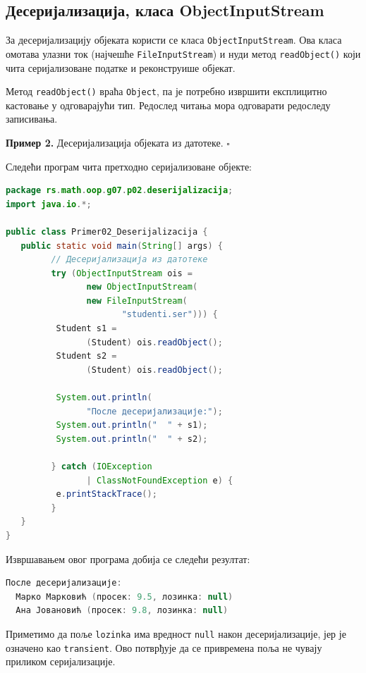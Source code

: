 \subsection{Десеријализација, класа ObjectInputStream}

За десеријализацију објеката користи се класа \texttt{ObjectInputStream}. Ова класа омотава улазни ток (најчешће \texttt{FileInputStream}) и нуди метод \texttt{readObject()} који чита серијализоване податке и реконструише објекат.

Метод \texttt{readObject()} враћа \texttt{Object}, па је потребно извршити експлицитно кастовање у одговарајући тип. Редослед читања мора одговарати редоследу записивања.


\bigskip

\noindent \textbf{Пример 2.} Десеријализација објеката из датотеке. $\square$

\medskip

Следећи програм чита претходно серијализоване објекте:


\begin{lstlisting}[language=Java]
package rs.math.oop.g07.p02.deserijalizacija;
import java.io.*;
 
public class Primer02_Deserijalizacija {
   public static void main(String[] args) {
         // Десеријализација из датотеке
         try (ObjectInputStream ois =
                new ObjectInputStream(
                new FileInputStream(
                       "studenti.ser"))) {
          Student s1 =
                (Student) ois.readObject();
          Student s2 =
                (Student) ois.readObject();
 
          System.out.println(
                "После десеријализације:");
          System.out.println("  " + s1);
          System.out.println("  " + s2);
 
         } catch (IOException
                | ClassNotFoundException e) {
          e.printStackTrace();
         }
   }
}
\end{lstlisting}


Извршавањем овог програма добија се следећи резултат:


\begin{lstlisting}[language=Java]
После десеријализације:
  Марко Марковић (просек: 9.5, лозинка: null)
  Ана Јовановић (просек: 9.8, лозинка: null)
\end{lstlisting}


Приметимо да поље \texttt{lozinka} има вредност \texttt{null} након десеријализације, јер је означено као \texttt{transient}. Ово потврђује да се привремена поља не чувају приликом серијализације.

